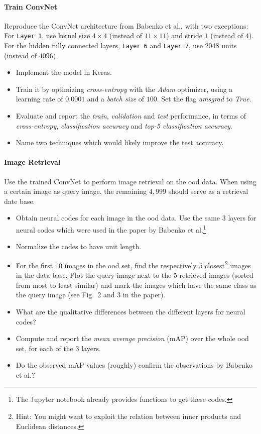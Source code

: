 \documentclass[a4paper,twoside,11pt]{article}
\begin{document}
\paragraph{Train ConvNet}
Reproduce the ConvNet architecture from Babenko et al., with two exceptions:
For \verb!Layer 1!, use kernel size $4 \times 4$ (instead of $11 \times 11$) and stride $1$ (instead of $4$).
For the hidden fully connected layers, \verb!Layer 6! and \verb!Layer 7!, use $2048$ units (instead of $4096$).
\begin{itemize}
\item Implement the model in Keras.
\item Train it by optimizing \emph{cross-entropy} with the \emph{Adam} optimizer, using a learning rate of $0.0001$ and a \emph{batch size} of $100$. Set the flag \emph{amsgrad} to \emph{True}.
\item Evaluate and report the \emph{train}, \emph{validation} and \emph{test} performance, in terms of \emph{cross-entropy}, \emph{classification accuracy} and \emph{top-5 classification accuracy}.
\item Name two techniques which would likely improve the test accuracy.
\end{itemize}


\paragraph{Image Retrieval}
Use the trained ConvNet to perform image retrieval on the ood data.
When using a certain image as query image, the remaining $4,999$ should serve as a retrieval date base.
\begin{itemize}
\item Obtain neural codes for each image in the ood data.
Use the same $3$ layers for neural codes which were used in the paper by Babenko et al.\footnote{The Jupyter notebook already provides functions to get these codes.}
\item Normalize the codes to have unit length.
\item For the first $10$ images in the ood set, find the respectively $5$ closest\footnote{Hint: You might want to exploit the relation between inner products and Euclidean distances.} images in the data base. 
Plot the query image next to the $5$ retrieved images (sorted from most to least similar) and mark the images which have the same class as the query image (see Fig.~2 and 3 in the paper).
\item What are the qualitative differences between the different layers for neural codes?
\item Compute and report the \emph{mean average precision} (mAP) over the whole ood set, for each of the $3$ layers. 
\item Do the observed mAP values (roughly) confirm the observations by Babenko et al.?
\end{itemize}
\end{document}
